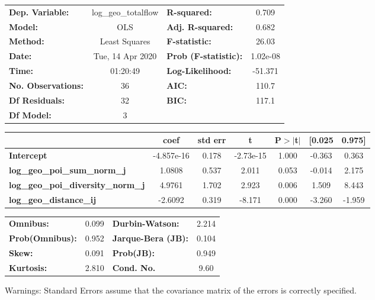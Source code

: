 \begin{center}
\begin{tabular}{lclc}
\toprule
\textbf{Dep. Variable:}                    & log\_geo\_totalflow & \textbf{  R-squared:         } &     0.709   \\
\textbf{Model:}                            &         OLS         & \textbf{  Adj. R-squared:    } &     0.682   \\
\textbf{Method:}                           &    Least Squares    & \textbf{  F-statistic:       } &     26.03   \\
\textbf{Date:}                             &   Tue, 14 Apr 2020  & \textbf{  Prob (F-statistic):} &  1.02e-08   \\
\textbf{Time:}                             &       01:20:49      & \textbf{  Log-Likelihood:    } &   -51.371   \\
\textbf{No. Observations:}                 &            36       & \textbf{  AIC:               } &     110.7   \\
\textbf{Df Residuals:}                     &            32       & \textbf{  BIC:               } &     117.1   \\
\textbf{Df Model:}                         &             3       & \textbf{                     } &             \\
\bottomrule
\end{tabular}
\begin{tabular}{lcccccc}
                                           & \textbf{coef} & \textbf{std err} & \textbf{t} & \textbf{P$> |$t$|$} & \textbf{[0.025} & \textbf{0.975]}  \\
\midrule
\textbf{Intercept}                         &   -4.857e-16  &        0.178     & -2.73e-15  &         1.000        &       -0.363    &        0.363     \\
\textbf{log\_geo\_poi\_sum\_norm\_j}       &       1.0808  &        0.537     &     2.011  &         0.053        &       -0.014    &        2.175     \\
\textbf{log\_geo\_poi\_diversity\_norm\_j} &       4.9761  &        1.702     &     2.923  &         0.006        &        1.509    &        8.443     \\
\textbf{log\_geo\_distance\_ij}            &      -2.6092  &        0.319     &    -8.171  &         0.000        &       -3.260    &       -1.959     \\
\bottomrule
\end{tabular}
\begin{tabular}{lclc}
\textbf{Omnibus:}       &  0.099 & \textbf{  Durbin-Watson:     } &    2.214  \\
\textbf{Prob(Omnibus):} &  0.952 & \textbf{  Jarque-Bera (JB):  } &    0.104  \\
\textbf{Skew:}          &  0.091 & \textbf{  Prob(JB):          } &    0.949  \\
\textbf{Kurtosis:}      &  2.810 & \textbf{  Cond. No.          } &     9.60  \\
\bottomrule
\end{tabular}
\end{center}

Warnings: \newline
 [1] Standard Errors assume that the covariance matrix of the errors is correctly specified.
